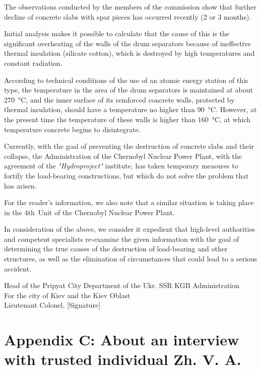 \documentclass[openright]{bookest}
\begin{document}
The observations conducted by the members of the commission show that further decline of concrete slabs with spar pieces has occurred recently (2 or 3 months).

Initial analysis makes it possible to calculate that the cause of this is the significant overheating of the walls of the drum separators because of ineffective thermal insulation (silicate cotton), which is destroyed by high temperatures and constant radiation.

According to technical conditions of the use of an atomic energy station of this type, the temperature in the area of the drum separators is maintained at about \qty{270}{\celsius}, and the inner surface of its reinforced concrete walls, protected by thermal insulation, should have a temperature no higher than \qty{90}{\celsius}. However, at the present time the temperature of these walls is higher than \qty{160}{\celsius}, at which temperature concrete begins to disintegrate.

Currently, with the goal of preventing the destruction of concrete slabs and their collapse, the Administration of the Chernobyl Nuclear Power Plant, with the agreement of the \textit{"Hydroproject"} institute, has taken temporary measures to fortify the load-bearing constructions, but which do not solve the problem that has arisen.

For the reader's information, we also note that a similar situation is taking place in the 4th~Unit of the Chernobyl Nuclear Power Plant.

In consideration of the above, we consider it expedient that high-level authorities and competent specialists re-examine the given information with the goal of determining the true causes of the destruction of load-bearing and other structures, as well as the elimination of circumstances that could lead to a serious accident.

Head of the Pripyat City Department of the Ukr. SSR KGB Administration \\

For the city of Kiev and the Kiev Oblast \\

Lieutenant Colonel, [Signature]

\chapter*{Appendix C: About an interview with trusted individual Zh. V. A.}
\end{document}
